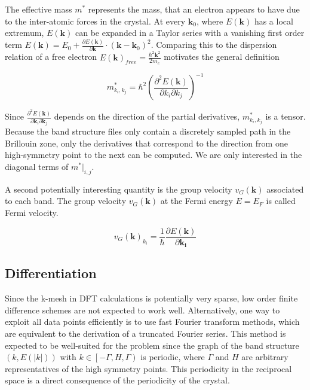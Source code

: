 The effective mass $m^{*}$ represents the mass, that an electron appears to have due to the inter-atomic forces in the crystal. At every $\mathbf{k}_0$, where $E(\mathbf{k})$ has a local extremum, $E(\mathbf{k})$ can be expanded in a Taylor series with a vanishing first order term $E(\mathbf{k}) = E_0 + \frac{\partial E(\mathbf{k})}{\partial \mathbf{k}} \cdot (\mathbf{k}-\mathbf{k}_0)^2$. Comparing this to the dispersion relation of a free electron $E(\mathbf{k})_{free} = \frac{\hbar^2 \mathbf{k}^2}{2 m_e}$ motivates the general definition 

\begin{equation}
    m^{*}_{k_i,k_j} = \hbar^2  \left(\frac{\partial^2E(\mathbf{k})}{\partial k_i \partial k_j}\right)^{-1}
\end{equation}

Since $\frac{\partial^2E(\mathbf{k})}{\partial \mathbf{k}_i \partial \mathbf{k}_j}$ depends on the direction of the partial derivatives, $m^{*}_{k_i,k_j}$ is a tensor. Because the band structure files only contain a discretely sampled path in the Brillouin zone, only the derivatives that correspond to the direction from one high-symmetry point to the next can be computed. We are only interested in the diagonal terms of $m^{*}\big|_{i,j}$.



A second potentially interesting quantity is the group velocity $v_{G}(\mathbf{k})$ associated to each band. The group velocity $v_{G}(\mathbf{k})$ at the Fermi energy $E = E_F$ is called Fermi velocity.

\begin{equation}
    v_{G}(\mathbf{k})_{k_i} = \frac{1}{\hbar}\frac{\partial E(\mathbf{k})}{\partial \mathbf{k_i}}
\end{equation}


\subsection{Differentiation}

Since the k-mesh in DFT calculations is potentially very sparse, low order finite difference schemes are not expected to work well. Alternatively, one way to exploit all data points efficiently is to use fast Fourier transform methods, which are equivalent to the derivation of a truncated Fourier series. This method is expected to be well-suited for the problem since the graph of the band structure $(k, E(|k|))$ with $k \in \left[-\Gamma, H, \Gamma \right) $ is periodic, where $\Gamma$ and $H$ are arbitrary representatives of the high symmetry points. This periodicity in the reciprocal space is a direct consequence of the periodicity of the crystal.

